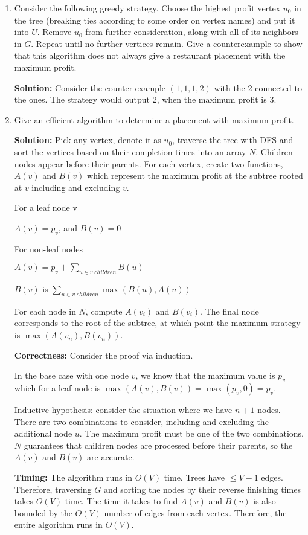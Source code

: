 \documentclass[12pt]{article}
\begin{document}
\begin{enumerate}[label=\textbf{\arabic*}]
	\item Consider the following greedy strategy. Choose the highest profit vertex $u_0$ in the tree (breaking ties according to some order on vertex names) and put it into $U$. Remove $u_0$ from further consideration, along with all of its neighbors in $G$. Repeat until no further vertices remain. Give a counterexample to show that this algorithm does not always give a restaurant placement with the maximum profit. \\
	\par{\textbf{Solution:} Consider the counter example $(1, 1, 1, 2)$ with the $2$ connected to the ones. The strategy would output $2$, when the maximum profit is $3$.}
	\item Give an efficient algorithm to determine a placement with maximum profit. \\
	\par{\textbf{Solution:} Pick any vertex, denote it as $u_0$, traverse the tree with DFS and sort the vertices based on their completion times into an array $N$. Children nodes appear before their parents. For each vertex, create two functions, $A(v)$ and $B(v)$ which represent the maximum profit at the subtree rooted at $v$ including and excluding $v$.}
	\par{For a leaf node v}
	\par{$A(v) = p_v$, and $B(v) = 0$}
	\par{For non-leaf nodes}
	\par{$A(v) = p_v + \sum_{u \in v.children}B(u)$}
	\par{$B(v)$ is $\sum_{u \in v.children}\max{(B(u), A(u))}$}
	\par{For each node in $N$, compute $A(v_i)$ and $B(v_i)$. The final node corresponds to the root of the subtree, at which point the maximum strategy is $\max{(A(v_n), B(v_n))}$.}
	\par{\textbf{Correctness:} Consider the proof via induction.}
	\par{In the base case with one node $v$, we know that the maximum value is $p_v$ which for a leaf node is $\max{(A(v), B(v))} = \max{(p_v, 0)} = p_v$.}
	\par{Inductive hypothesis: consider the situation where we have $n + 1$ nodes. There are two combinations to consider, including and excluding the additional node $u$. The maximum profit must be one of the two combinations. $N$ guarantees that children nodes are processed before their parents, so the $A(v)$ and $B(v)$ are accurate.}
	\par{\textbf{Timing:} The algorithm runs in $O(V)$ time. Trees have $\leq V - 1$ edges. Therefore, traversing $G$ and sorting the nodes by their reverse finishing times takes $O(V)$ time. The time it takes to find $A(v)$ and $B(v)$ is also bounded by the $O(V)$ number of edges from each vertex. Therefore, the entire algorithm runs in $O(V)$.}
\end{enumerate}
\end{document}
